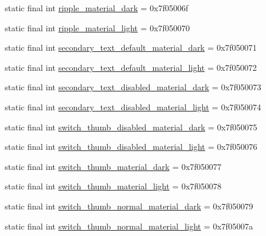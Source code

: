 \begin{DoxyCompactItemize}
\item 
static final int \mbox{\hyperlink{classcom_1_1google_1_1android_1_1gms_1_1R_1_1color_a9808e164b8b3ff0d6af75a3c6b9b9745}{ripple\+\_\+material\+\_\+dark}} = 0x7f05006f
\item 
static final int \mbox{\hyperlink{classcom_1_1google_1_1android_1_1gms_1_1R_1_1color_aa155176ef2f5ca3100f2f551e5bd5bd0}{ripple\+\_\+material\+\_\+light}} = 0x7f050070
\item 
static final int \mbox{\hyperlink{classcom_1_1google_1_1android_1_1gms_1_1R_1_1color_aa06f3b3467ea706b75e8f365a9c3b548}{secondary\+\_\+text\+\_\+default\+\_\+material\+\_\+dark}} = 0x7f050071
\item 
static final int \mbox{\hyperlink{classcom_1_1google_1_1android_1_1gms_1_1R_1_1color_a9021a1ada48aeb7723b37455b2c113a9}{secondary\+\_\+text\+\_\+default\+\_\+material\+\_\+light}} = 0x7f050072
\item 
static final int \mbox{\hyperlink{classcom_1_1google_1_1android_1_1gms_1_1R_1_1color_a5fb7e2ed69de81807934f6d90b73b825}{secondary\+\_\+text\+\_\+disabled\+\_\+material\+\_\+dark}} = 0x7f050073
\item 
static final int \mbox{\hyperlink{classcom_1_1google_1_1android_1_1gms_1_1R_1_1color_ad2b1485c5360388da594c8fadde362a8}{secondary\+\_\+text\+\_\+disabled\+\_\+material\+\_\+light}} = 0x7f050074
\item 
static final int \mbox{\hyperlink{classcom_1_1google_1_1android_1_1gms_1_1R_1_1color_a971e2592d0acf4687175c2aa313758a0}{switch\+\_\+thumb\+\_\+disabled\+\_\+material\+\_\+dark}} = 0x7f050075
\item 
static final int \mbox{\hyperlink{classcom_1_1google_1_1android_1_1gms_1_1R_1_1color_a97c68761412aa89e294a2ef10d519275}{switch\+\_\+thumb\+\_\+disabled\+\_\+material\+\_\+light}} = 0x7f050076
\item 
static final int \mbox{\hyperlink{classcom_1_1google_1_1android_1_1gms_1_1R_1_1color_a20033ad3732b2f671f81ed775f41df71}{switch\+\_\+thumb\+\_\+material\+\_\+dark}} = 0x7f050077
\item 
static final int \mbox{\hyperlink{classcom_1_1google_1_1android_1_1gms_1_1R_1_1color_a14c6eee5092ea5e7dfaf5d82ab1a9827}{switch\+\_\+thumb\+\_\+material\+\_\+light}} = 0x7f050078
\item 
static final int \mbox{\hyperlink{classcom_1_1google_1_1android_1_1gms_1_1R_1_1color_a2e788e43d8a4c4a5b0d7ef52c66da11f}{switch\+\_\+thumb\+\_\+normal\+\_\+material\+\_\+dark}} = 0x7f050079
\item 
static final int \mbox{\hyperlink{classcom_1_1google_1_1android_1_1gms_1_1R_1_1color_a7c46f67bbe3048e49bc7c0876a402c5f}{switch\+\_\+thumb\+\_\+normal\+\_\+material\+\_\+light}} = 0x7f05007a
\end{DoxyCompactItemize}


